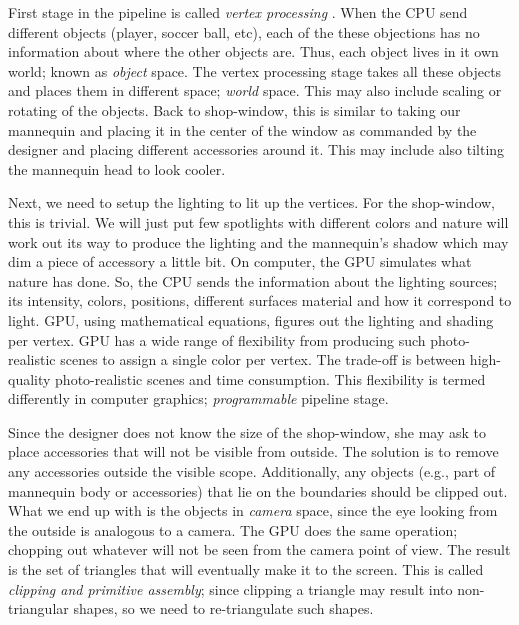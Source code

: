 \documentclass[12pt] {article}
\begin{document}
First stage in the pipeline is called \emph{vertex processing} \cite{angle2011interactive}. When the CPU send different objects (player, soccer ball, etc), each of the these objections has no information about where the other objects are. Thus, each object lives in it own world; known as \emph{object} space. The vertex processing stage takes all these objects and places them in different space; \emph{world} space. This may also include scaling or rotating of the objects. Back to shop-window, this is similar to taking our mannequin and placing it in the center of the window as commanded by the designer and placing different accessories around it. This may include also tilting the mannequin head to look cooler. 

Next, we need to setup the lighting to lit up the vertices. For the shop-window, this is trivial. We will just put few spotlights with different colors and nature will work out its way to produce the lighting and the mannequin's shadow which may dim a piece of accessory a little bit. On computer, the GPU simulates what nature has done. So, the CPU sends the information about the lighting sources; its intensity, colors, positions, different surfaces material and how it correspond to light. GPU, using mathematical equations, figures out the lighting and shading per vertex. GPU has a wide range of flexibility from producing such photo-realistic scenes to assign a single color per vertex. The trade-off is between high-quality photo-realistic scenes and time consumption. This flexibility is termed differently in computer graphics; \emph{programmable} pipeline stage.

Since the designer does not know the size of the shop-window, she may ask to place accessories that will not be visible from outside. The solution is to remove any accessories outside the visible scope. Additionally, any objects (e.g., part of mannequin body or accessories) that lie on the boundaries should be clipped out. What we end up with is the objects in \emph{camera} space, since the eye looking from the outside is analogous to a camera. The GPU does the same operation; chopping out whatever will not be seen from the camera point of view. The result is the set of triangles that will eventually make it to the screen. This is called \emph{clipping and primitive assembly}; since clipping a triangle may result into non-triangular shapes, so we need to re-triangulate such shapes.
\end{document}
